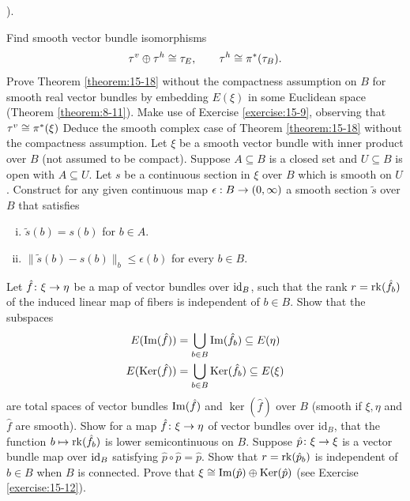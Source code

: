 \begin{enumerate}[label=\theexercise.\arabic*.,ref=\theexercise.\arabic*,leftmargin=2.7em]
    ).\par
    Find smooth vector bundle isomorphisms
    \[
      \tau^v\oplus \tau^h \cong \tau_E, \qquad \tau^h\cong \pi^*(\tau_B).
    \]
  \NewItem Prove Theorem \ref{theorem:15-18} without the compactness assumption
    on $B$ for smooth real vector bundles by embedding $E(\xi)$ in some Euclidean space (Theorem \ref{theorem:8-11}).
    Make use of Exercise \ref{exercise:15-9}, observing that $\tau^v\cong \pi^*(\xi)$
    Deduce the smooth complex case of Theorem \ref{theorem:15-18} without the compactness assumption.
  \NewItem Let $\xi$ be a smooth vector bundle with inner product over $B$ (not assumed to be compact). Suppose $A \subseteq  B$ is a closed set and $U \subseteq  B$ is open with $A \subseteq  U$. Let $s$ be a continuous section in $\xi$ over $B$ which is smooth on $U$. Construct for any given continuous map $\epsilon  : B \rightarrow  ( {0,\infty })$ a smooth section $\tilde{s}$ over $B$ that satisfies
    \begin{enumerate}[(i)]
      \item $\tilde{s}( b)  = s( b)$ for $b \in  A$.
      \item $\| \tilde{s}( b) - s( b) {\| }_{b} \leq  \epsilon ( b)$ for every $b \in  B$.
    \end{enumerate}
  \NewItem Let $\hat{f}\colon \xi  \rightarrow  \eta$ be a map of vector bundles over ${\mathrm{id}}_{B}$, such that the rank $r = \mathrm{rk}( {\hat{f}}_{b})$ of the induced linear map of fibers is independent of $b \in  B$. Show that the subspaces
    \[
    \begin{aligned}
      E( {\operatorname{Im}( \hat{f}) })  & = \mathop{\bigcup }\limits_{{b \in  B}}\operatorname{Im}( {\hat{f}}_{b})  \subseteq  E( \eta ) \\
      E( {{\operatorname{Ker}}( \hat{f}) })  & = \mathop{\bigcup }\limits_{{b \in  B}}{\operatorname{Ker}}( {\hat{f}}_{b})  \subseteq  E( \xi )
    \end{aligned}
    \]
    are total spaces of vector bundles $\operatorname{Im}( \hat{f})$ and ${\ker}( \hat{f})$ over $B$ (smooth if $\xi,\eta$ and $\hat{f}$ are smooth).
  \NewItem Show for a map $\hat{f}\colon \xi  \rightarrow  \eta$ of vector bundles over ${\mathrm{{id}}}_{B}$, that the function $b \mapsto  \mathrm{rk}( {\hat{f}}_{b})$ is lower semicontinuous on $B$.
  \NewItem Suppose $\hat{p}\colon \xi  \rightarrow  \xi$ is a vector bundle map over ${\mathrm{id}}_{B}$ satisfying $\hat{p} \circ  \hat{p} = \hat{p}$. Show that $r = \mathrm{rk}( {\hat{p}}_{b})$ is independent of $b \in  B$ when $B$ is connected. Prove that $\xi  \cong  \operatorname{Im}( \hat{p})  \oplus  {\operatorname{Ker}}( \hat{p})$ (see Exercise \ref{exercise:15-12}).

\end{enumerate}
